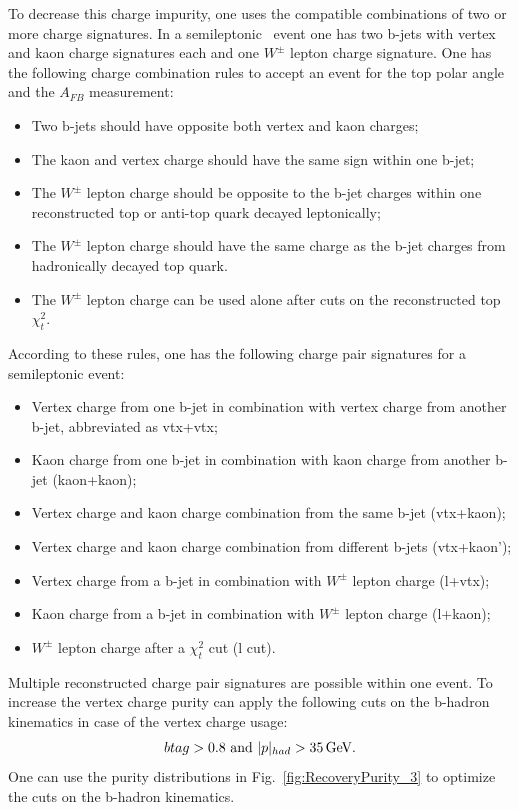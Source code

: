 To decrease this charge impurity, one uses the compatible combinations of two or more charge signatures.
In a semileptonic \ttbar\ event one has two b-jets with vertex and kaon charge signatures each and one $W^\pm$ lepton charge signature. 
One has the following charge combination rules to accept an event for the top polar angle and the $A_{FB}$ measurement:
\begin{itemize}
	\item Two b-jets should have opposite both vertex and kaon charges;
	\item The kaon and vertex charge should have the same sign within one b-jet;
	\item The $W^\pm$ lepton charge should be opposite to the b-jet charges within one reconstructed top or anti-top quark decayed leptonically; 
	\item The  $W^\pm$ lepton charge should have the same charge as the b-jet charges from hadronically decayed top quark.
	\item The $W^\pm$ lepton charge can be used alone after cuts on the reconstructed top $\chi^2_{t}$.
\end{itemize}

According to these rules, one has the following charge pair signatures for a semileptonic \ttbar event:
\begin{itemize}
	\item Vertex charge from one b-jet in combination with vertex charge from another b-jet, abbreviated as {\sc vtx+vtx};
	\item Kaon charge from one b-jet in combination with kaon charge from another b-jet ({\sc kaon+kaon});
	\item Vertex charge and kaon charge combination from the same b-jet ({\sc vtx+kaon});
	\item Vertex charge and kaon charge combination from different b-jets ({\sc vtx+kaon'});
	\item  Vertex charge from a b-jet  in combination with $W^\pm$ lepton charge ({\sc l+vtx});
	\item  Kaon charge from a b-jet in combination with $W^\pm$ lepton charge ({\sc l+kaon});
	\item $W^\pm$ lepton charge after a $\chi^2_{t}$ cut  ({\sc l }cut).
\end{itemize}
Multiple reconstructed charge pair signatures are possible within one event.
To increase the vertex charge purity can apply the following cuts on the b-hadron kinematics in case of the vertex charge usage:
\begin{equation}
	btag > 0.8\text{ and } |p|_{had} > 35\text{\,GeV}.
\end{equation}
One can use the purity distributions in Fig.~\ref{fig:RecoveryPurity_3} to optimize the cuts on the b-hadron kinematics. 

